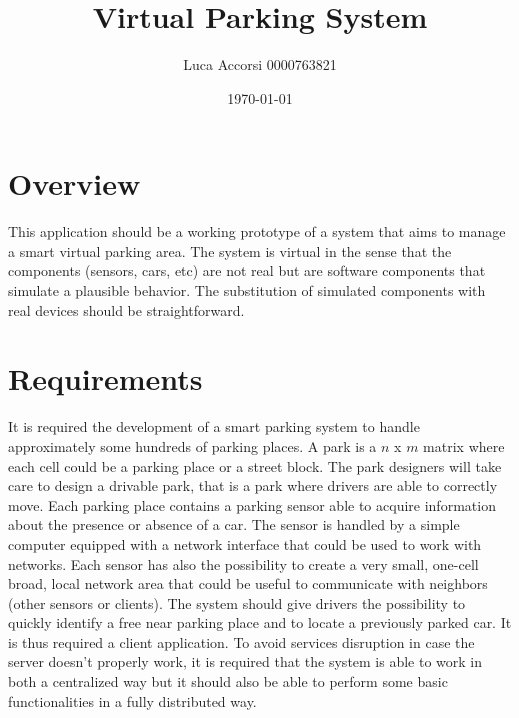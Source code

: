 \documentclass[11pt]{article}
\title{\textbf{Virtual Parking System}}
\author{Luca Accorsi 0000763821}
\date{\today}
\begin{document}
\maketitle

\section{Overview}
This application should be a working prototype of a system that aims to manage a smart virtual parking area. The system is virtual in the sense that the components (sensors, cars, etc) are not real but are software components that simulate a plausible behavior. The substitution of simulated components with real devices should be straightforward.

\section{Requirements}
It is required the development of a smart parking system to handle approximately some hundreds of parking places. A park is a $n$ x $m$ matrix where each cell could be a parking place or a street block. The park designers will take care to design a drivable park, that is a park where drivers are able to correctly move. Each parking place contains a parking sensor able to acquire information about the presence or absence of a car. The sensor is handled by a simple computer equipped with a network interface that could be used to work with networks. Each sensor has also the possibility to create a very small, one-cell broad, local network area that could be useful to communicate with neighbors (other sensors or clients). The system should give drivers the possibility to quickly identify a free near parking place and to locate a previously parked car. It is thus required a client application. To avoid services disruption in case the server doesn't properly work, it is required that the system is able to work in both a centralized way but it should also be able to perform some basic functionalities in a fully distributed way.
\end{document}
